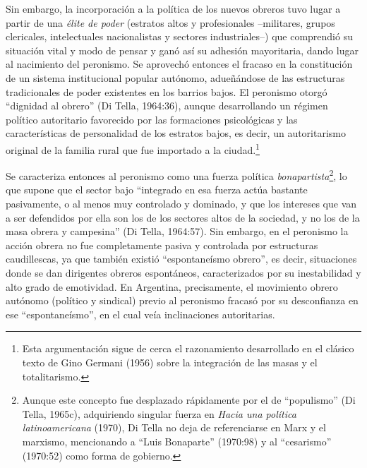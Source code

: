 Sin embargo, la incorporación a la política de los nuevos obreros tuvo lugar a partir de una \emph{élite de poder} (estratos altos y profesionales --militares, grupos clericales, intelectuales nacionalistas y sectores industriales--) que comprendió su situación vital y modo de pensar y ganó así su adhesión mayoritaria, dando lugar al nacimiento del peronismo. Se aprovechó entonces el fracaso en la constitución de un sistema institucional popular autónomo, adueñándose de las estructuras tradicionales de poder existentes en los barrios bajos. El peronismo otorgó \enquote{dignidad al obrero} (Di Tella, 1964:36), aunque desarrollando un régimen político autoritario favorecido por las formaciones psicológicas y las características de personalidad de los estratos bajos, es decir, un autoritarismo original de la familia rural que fue importado a la ciudad.\footnote{Esta argumentación sigue de cerca el razonamiento desarrollado en el clásico texto de Gino Germani (1956) sobre la integración de las masas y el totalitarismo.}

Se caracteriza entonces al peronismo como una fuerza política \emph{bonapartista}\footnote{Aunque este concepto fue desplazado rápidamente por el de \enquote{populismo} (Di Tella, 1965c), adquiriendo singular fuerza en \emph{Hacia una política latinoamericana} (1970), Di Tella no deja de referenciarse en Marx y el marxismo, mencionando a \enquote{Luis Bonaparte} (1970:98) y al \enquote{cesarismo} (1970:52) como forma de gobierno.}, lo que supone que el sector bajo \enquote{integrado en esa fuerza actúa bastante pasivamente, o al menos muy controlado y dominado, y que los intereses que van a ser defendidos por ella son los de los sectores altos de la sociedad, y no los de la masa obrera y campesina} (Di Tella, 1964:57). Sin embargo, en el peronismo la acción obrera no fue completamente pasiva y controlada por estructuras caudillescas, ya que también existió \enquote{espontaneísmo obrero}, es decir, situaciones donde se dan dirigentes obreros espontáneos, caracterizados por su inestabilidad y alto grado de emotividad. En Argentina, precisamente, el movimiento obrero autónomo (político y sindical) previo al peronismo fracasó por su desconfianza en ese \enquote{espontaneísmo}, en el cual veía inclinaciones autoritarias.

